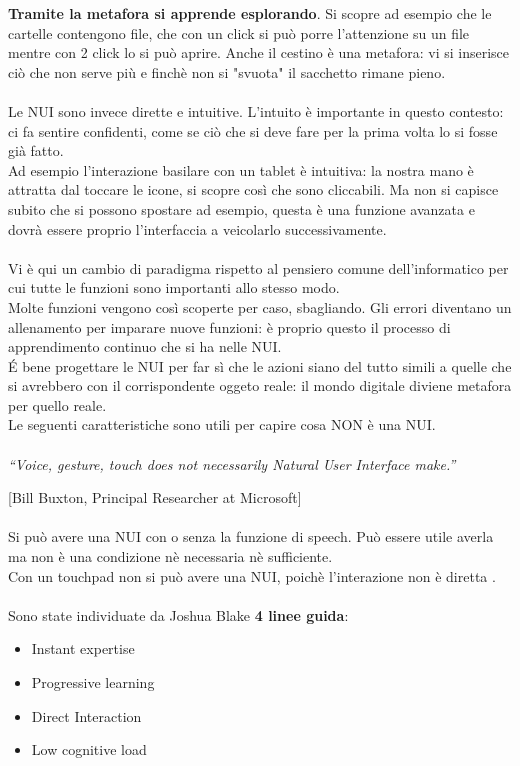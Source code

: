 \textbf{Tramite la metafora si apprende esplorando}. Si scopre ad esempio che le cartelle contengono file, che con un click si può porre l'attenzione su un file mentre con 2 click lo si può aprire. Anche il cestino è una metafora: vi si inserisce ciò che non serve più e finchè non si "svuota" il sacchetto rimane pieno.
\\
\\Le NUI sono invece dirette e intuitive. L'intuito è importante in questo contesto: ci fa sentire confidenti, come se ciò che si deve fare per la prima volta lo si fosse già fatto.\\
Ad esempio l'interazione basilare con un tablet è intuitiva: la nostra mano è attratta dal toccare le icone, si scopre così che sono cliccabili. Ma non si capisce subito che si possono spostare ad esempio, questa è una funzione avanzata e dovrà essere proprio l'interfaccia a veicolarlo successivamente.
\\
\\ Vi è qui un cambio di paradigma rispetto al pensiero comune dell'informatico per cui tutte le funzioni sono importanti allo stesso modo.\\
Molte funzioni vengono così scoperte per caso, sbagliando. Gli errori diventano un allenamento per imparare nuove funzioni: è proprio questo il processo di apprendimento continuo che si ha nelle NUI.\\
É bene progettare le NUI per far sì che le azioni siano del tutto simili a quelle che si avrebbero con il corrispondente oggeto reale: il mondo digitale diviene metafora per quello reale.\\
Le seguenti caratteristiche sono utili per capire cosa NON è una NUI.\\
\\
\textit{“Voice, gesture, touch does not necessarily Natural User Interface make.”}

[Bill Buxton, Principal Researcher at Microsoft]
\\
\\Si può avere una NUI con o senza la funzione di speech. Può essere utile averla ma non è una condizione nè necessaria nè sufficiente.\\
Con un touchpad non si può avere una NUI, poichè l'interazione non è diretta .\\
\\Sono state individuate da Joshua Blake \textbf{4 linee guida}:
\begin{itemize}
\item Instant expertise
\item Progressive learning
\item Direct Interaction
\item Low cognitive load
\end{itemize}


